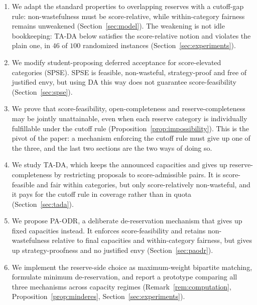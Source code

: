 \documentclass[a4paper,twoside]{article}
\theoremstyle{definition}
\begin{document}
\begin{enumerate}
\item We adapt the standard properties to overlapping reserves with a cutoff-gap rule: non-wastefulness must be score-relative, while within-category fairness remains unweakened (Section~\ref{sec:model}). The weakening is not idle bookkeeping: TA-DA below satisfies the score-relative notion and violates the plain one, in $46$ of $100$ randomized instances (Section~\ref{sec:experiments}).
\item We modify student-proposing deferred acceptance for score-elevated categories (SPSE). SPSE is feasible, non-wasteful, strategy-proof and free of justified envy, but using DA this way does not guarantee score-feasibility (Section~\ref{sec:spse}).
\item We prove that score-feasibility, open-completeness and reserve-completeness may be jointly unattainable, even when each reserve category is individually fulfillable under the cutoff rule (Proposition~\ref{prop:impossibility}). This is the pivot of the paper: a mechanism enforcing the cutoff rule must give up one of the three, and the last two sections are the two ways of doing so.
\item We study TA-DA, which keeps the announced capacities and gives up reserve-completeness by restricting proposals to score-admissible pairs. It is score-feasible and fair within categories, but only score-relatively non-wasteful, and it pays for the cutoff rule in coverage rather than in quota (Section~\ref{sec:tada}).
\item We propose PA-ODR, a deliberate de-reservation mechanism that gives up fixed capacities instead. It enforces score-feasibility and retains non-wastefulness relative to final capacities and within-category fairness, but gives up strategy-proofness and no justified envy (Section~\ref{sec:paodr}).
\item We implement the reserve-side choice as maximum-weight bipartite matching, formulate minimum de-reservation, and report a prototype comparing all three mechanisms across capacity regimes (Remark~\ref{rem:computation}, Proposition~\ref{prop:minderes}, Section~\ref{sec:experiments}).
\end{enumerate}
\end{document}
